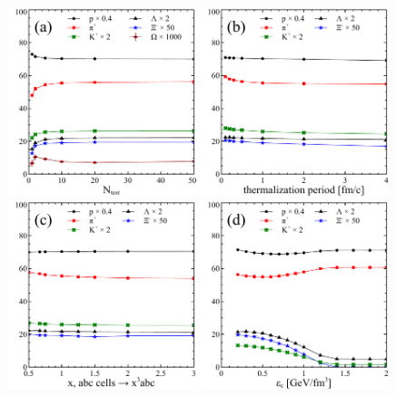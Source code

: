 \begin{figure}
  \centering
  \includegraphics[width=0.49\textwidth]{plots/forced_thermalization/mult_ntest.pdf}
  \includegraphics[width=0.49\textwidth]{plots/forced_thermalization/mult_dt.pdf} \\
  \includegraphics[width=0.49\textwidth]{plots/forced_thermalization/mult_dr.pdf}
  \includegraphics[width=0.49\textwidth]{plots/forced_thermalization/mult_ec.pdf}

\end{figure}
